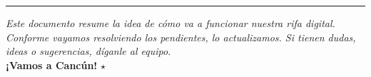 \documentclass[12pt,a4paper]{article}
\begin{document}
\vspace{1.5em}
\hrule
\vspace{1em}

\begin{center}
\textit{Este documento resume la idea de cómo va a funcionar nuestra rifa digital. Conforme vayamos resolviendo los pendientes, lo actualizamos. Si tienen dudas, ideas o sugerencias, díganle al equipo.}\\[1em]
{\Large \textbf{¡Vamos a Cancún!}} $\star$
\end{center}
\end{document}
